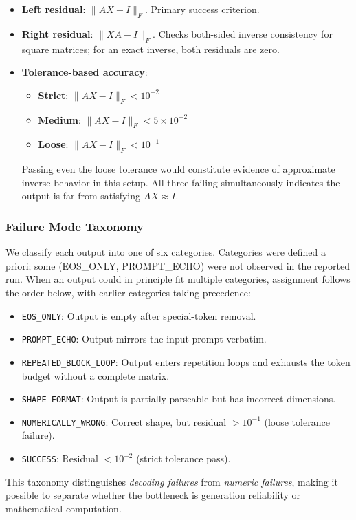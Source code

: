 \begin{itemize}
    \item \textbf{Left residual}: $\|AX - I\|_F$. Primary success criterion.
    \item \textbf{Right residual}: $\|XA - I\|_F$. Checks both-sided inverse consistency for square matrices; for an exact inverse, both residuals are zero.
    \item \textbf{Tolerance-based accuracy}:
    \begin{itemize}
        \item \textbf{Strict}: $\|AX - I\|_F < 10^{-2}$
        \item \textbf{Medium}: $\|AX - I\|_F < 5 \times 10^{-2}$
        \item \textbf{Loose}: $\|AX - I\|_F < 10^{-1}$
    \end{itemize}
    Passing even the loose tolerance would constitute evidence of approximate inverse behavior in this setup. All three failing simultaneously indicates the output is far from satisfying $AX \approx I$.
\end{itemize}

\subsubsection{Failure Mode Taxonomy}

We classify each output into one of six categories. Categories were defined a priori; some (EOS\_ONLY, PROMPT\_ECHO) were not observed in the reported run. When an output could in principle fit multiple categories, assignment follows the order below, with earlier categories taking precedence:

\begin{itemize}
    \item \texttt{EOS\_ONLY}: Output is empty after special-token removal.
    \item \texttt{PROMPT\_ECHO}: Output mirrors the input prompt verbatim.
    \item \texttt{REPEATED\_BLOCK\_LOOP}: Output enters repetition loops and exhausts the token budget without a complete matrix.
    \item \texttt{SHAPE\_FORMAT}: Output is partially parseable but has incorrect dimensions.
    \item \texttt{NUMERICALLY\_WRONG}: Correct shape, but residual $> 10^{-1}$ (loose tolerance failure).
    \item \texttt{SUCCESS}: Residual $< 10^{-2}$ (strict tolerance pass).
\end{itemize}

This taxonomy distinguishes \emph{decoding failures} from \emph{numeric failures}, making it possible to separate whether the bottleneck is generation reliability or mathematical computation.
